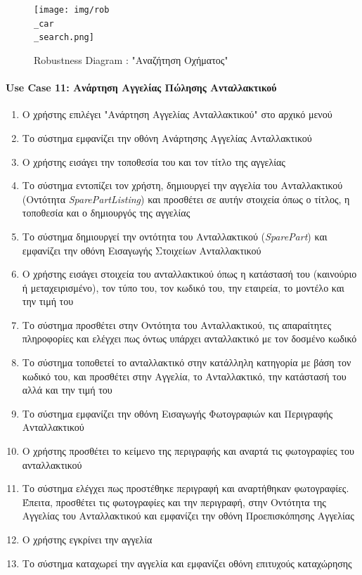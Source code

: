 \documentclass{../ol-softwaremanual}
\begin{document}
	
	\begin{figure}[htbp!]
		\texttt{[image: img/rob\\\_car\\\_search.png]}
		\caption{\en Robustness Diagram : "\gr Αναζήτηση Οχήματος\en"\gr}
	\end{figure}
	
	
	
	\newpage
	\centering
		\paragraph{\en Use Case 11: \gr Ανάρτηση Αγγελίας Πώλησης Ανταλλακτικού \gr}
	\begin{enumerate}
		\item Ο χρήστης επιλέγει \en"\gr Ανάρτηση Αγγελίας Ανταλλακτικού\en" \gr στο αρχικό μενού
		\item Το σύστημα εμφανίζει την οθόνη Ανάρτησης Αγγελίας Ανταλλακτικού
		\item Ο χρήστης εισάγει την τοποθεσία του και τον τίτλο της αγγελίας		
		\item Το σύστημα εντοπίζει τον χρήστη, δημιουργεί την αγγελία του Ανταλλακτικού (Οντότητα \en\textit{SparePartListing}\gr) και προσθέτει σε αυτήν στοιχεία όπως ο τίτλος, η τοποθεσία και ο δημιουργός της αγγελίας
		\item Το σύστημα δημιουργεί την οντότητα του Ανταλλακτικού (\en \textit{SparePart}\gr) και εμφανίζει την οθόνη Εισαγωγής Στοιχείων Ανταλλακτικού		
		\item Ο χρήστης εισάγει στοιχεία του ανταλλακτικού όπως η κατάστασή του (καινούριο ή μεταχειρισμένο), τον τύπο του, τον κωδικό του, την εταιρεία, το μοντέλο και την τιμή του		
		\item Το σύστημα προσθέτει στην Οντότητα του Ανταλλακτικού, τις απαραίτητες πληροφορίες και ελέγχει πως όντως υπάρχει ανταλλακτικό με τον δοσμένο κωδικό		
		\item Το σύστημα τοποθετεί το ανταλλακτικό στην κατάλληλη κατηγορία με βάση τον κωδικό του, και προσθέτει στην Αγγελία, το Ανταλλακτικό, την κατάστασή του αλλά και την τιμή του
		\item Το σύστημα εμφανίζει την οθόνη Εισαγωγής Φωτογραφιών και Περιγραφής Ανταλλακτικού
		\item Ο χρήστης προσθέτει το κείμενο της περιγραφής και αναρτά τις φωτογραφίες του ανταλλακτικού		
		\item Το σύστημα ελέγχει πως προστέθηκε περιγραφή και αναρτήθηκαν φωτογραφίες. Έπειτα, προσθέτει τις φωτογραφίες και την περιγραφή, στην Οντότητα της Αγγελίας του Ανταλλακτικού και εμφανίζει την οθόνη Προεπισκόπησης Αγγελίας		
		\item Ο χρήστης εγκρίνει την αγγελία		
		\item Το σύστημα καταχωρεί την αγγελία και εμφανίζει οθόνη επιτυχούς καταχώρησης
	\end{enumerate}
	
\end{document}
